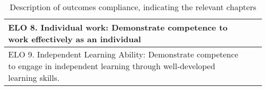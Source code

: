 \begin{table}[H]
\begin{center}
\begin{tabular}{ | p{8cm} | l | p{5cm} |}
    ELO 8. Individual work: Demonstrate competence to work effectively as an individual &  &  \\  \hline



    ELO 9. Independent Learning Ability: Demonstrate competence to engage in independent learning through well‐developed learning skills. &  &  \\  \hline

    \hline
    \end{tabular}
\end{center}
  \caption{ Description of outcomes compliance, indicating the relevant chapters}
    \label{tab:tableb1}
\end{table}